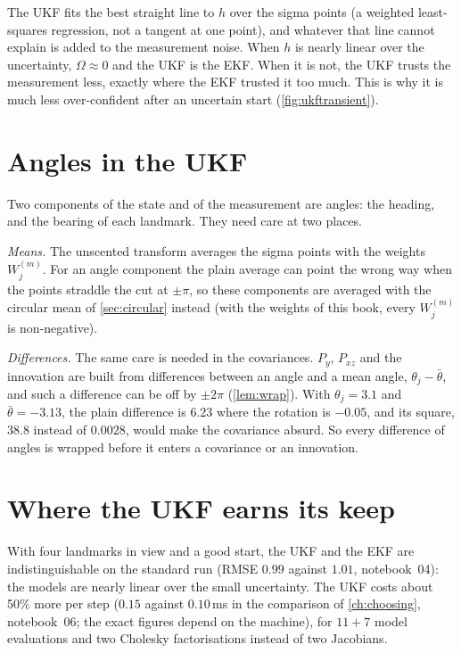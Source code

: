 \begin{inwords}
The UKF fits the best straight line to $h$ over the sigma points (a
weighted least-squares regression, not a tangent at one point), and
whatever that line cannot explain is added to the measurement noise. When
$h$ is nearly linear over the uncertainty, $\Omega\approx0$ and the UKF is
the EKF. When it is not, the UKF trusts the measurement less, exactly
where the EKF trusted it too much. This is why it is much less
over-confident after an uncertain start (\cref{fig:ukftransient}).
\end{inwords}


\section{Angles in the UKF}
\label{sec:ukf-angles}

Two components of the state and of the measurement are angles: the
heading, and the bearing of each landmark. They need care at two places.

\emph{Means.} The unscented transform averages the sigma points with the
weights $W^{(m)}_j$. For an angle component the plain average can point
the wrong way when the points straddle the cut at $\pm\pi$, so these
components are averaged with the circular mean of \cref{sec:circular}
instead (with the weights of this book, every $W^{(m)}_j$ is
non-negative).

\emph{Differences.} The same care is needed in the covariances. $P_y$,
$P_{xz}$ and the innovation are built from differences between an angle
and a mean angle, $\theta_j-\bar\theta$, and such a difference can be off
by $\pm2\pi$ (\cref{lem:wrap}). With $\theta_j=3.1$ and
$\bar\theta=-3.13$, the plain difference is $6.23$ where the rotation is
$-0.05$, and its square, $38.8$ instead of $0.0028$, would make the
covariance absurd. So every difference of angles is wrapped before it
enters a covariance or an innovation.

\section{Where the UKF earns its keep}

With four landmarks in view and a good start, the UKF and the EKF are
indistinguishable on the standard run (RMSE $0.99$ against $1.01$,
notebook~04): the models are nearly linear over the small uncertainty.
The UKF costs about 50\% more per step ($0.15$ against $0.10$\,ms in the
comparison of \cref{ch:choosing}, notebook~06; the exact figures depend
on the machine), for
$11+7$ model evaluations and two Cholesky factorisations instead of two
Jacobians.

